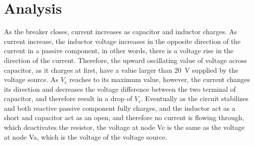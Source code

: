 \documentclass{article}
\begin{document}
\section*{Analysis}
As the breaker closes, current increases as capacitor and inductor charges. As current increase, the inductor voltage increases in the opposite direction of the current in a passive component, in other words, there is a voltage rise in the direction of the current. Therefore, the upward oscillating value of voltage across capacitor, as it charges at first, have a value larger than \SI{20}{\volt} supplied by the voltage source. As $V_c$ reaches to its maximum value, however, the current changes its direction and decreases the voltage difference between the two terminal of capacitor, and therefore result in a drop of $V_c$. Eventually as the circuit stabilizes and both reactive passive component fully charges, and the inductor act as a short and capacitor act as an open, and therefore no current is flowing through, which deactivates the resistor, the voltage at node Vc is the same as the voltage at node Va, which is the voltage of the voltage source.
\end{document}
